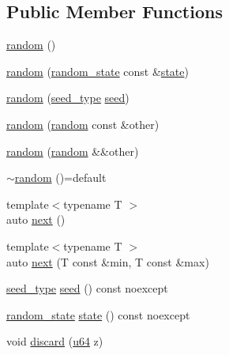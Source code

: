 \subsection*{Public Member Functions}
\begin{DoxyCompactItemize}
\item 
\mbox{\hyperlink{classpyrite_1_1random_ac3e5e10f4dd1474afe856780ba8d71e3}{random}} ()
\item 
\mbox{\hyperlink{classpyrite_1_1random_a593c1826bad1b27d489ee55c85da30b3}{random}} (\mbox{\hyperlink{structpyrite_1_1random__state}{random\+\_\+state}} const \&\mbox{\hyperlink{classpyrite_1_1random_a25c469022ddee73c6a4ecce2814d22d4}{state}})
\item 
\mbox{\hyperlink{classpyrite_1_1random_a9f0f5391be20a8fdc3d6009e14dc0bfe}{random}} (\mbox{\hyperlink{classpyrite_1_1random_a936dc9fd106c9b125ccbf3aa6d525e4b}{seed\+\_\+type}} \mbox{\hyperlink{classpyrite_1_1random_ae3a15129c724af7168f55135226c0dfc}{seed}})
\item 
\mbox{\hyperlink{classpyrite_1_1random_ab3ef314958056708117ab37d2dded013}{random}} (\mbox{\hyperlink{classpyrite_1_1random}{random}} const \&other)
\item 
\mbox{\hyperlink{classpyrite_1_1random_a263c5a878b5aaa150d915d765420f294}{random}} (\mbox{\hyperlink{classpyrite_1_1random}{random}} \&\&other)
\item 
\mbox{\hyperlink{classpyrite_1_1random_ae8d71dcc48a9eb0fe84525b368b91e05}{$\sim$random}} ()=default
\item 
{\footnotesize template$<$typename T $>$ }\\auto \mbox{\hyperlink{classpyrite_1_1random_a708282ad1435ee4b9564c8e11baf43f8}{next}} ()
\item 
{\footnotesize template$<$typename T $>$ }\\auto \mbox{\hyperlink{classpyrite_1_1random_a79e67ec7537ab7e872cb1327dbe0bb3e}{next}} (T const \&min, T const \&max)
\item 
\mbox{\hyperlink{classpyrite_1_1random_a936dc9fd106c9b125ccbf3aa6d525e4b}{seed\+\_\+type}} \mbox{\hyperlink{classpyrite_1_1random_ae3a15129c724af7168f55135226c0dfc}{seed}} () const noexcept
\item 
\mbox{\hyperlink{structpyrite_1_1random__state}{random\+\_\+state}} \mbox{\hyperlink{classpyrite_1_1random_a25c469022ddee73c6a4ecce2814d22d4}{state}} () const noexcept
\item 
void \mbox{\hyperlink{classpyrite_1_1random_a8414030e5c428c20b8a8333542918f8c}{discard}} (\mbox{\hyperlink{type_8hpp_a89cb75b6e56f357c2964bbd5520be899}{u64}} z)

\end{DoxyCompactItemize}

